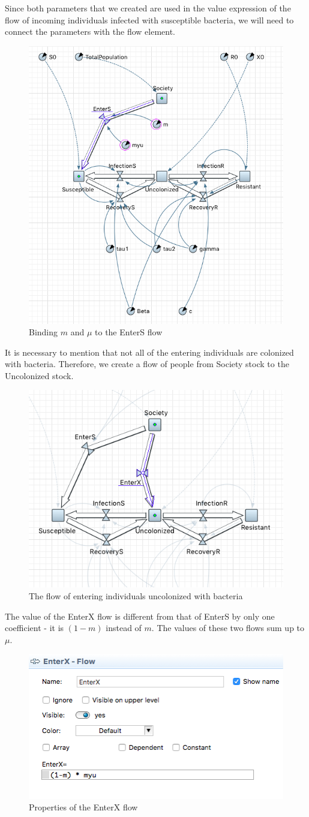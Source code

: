 Since both parameters that we created are used in the value expression of the flow of incoming individuals infected with susceptible bacteria, we will need to connect the parameters with the flow element.

\begin{figure}[H]
  \centering
  \includegraphics[height=0.6\textwidth]{img/screens/society/society8}
  \caption{Binding $m$ and $\mu$ to the EnterS flow}
\end{figure}

It is necessary to mention that not all of the entering individuals are colonized with bacteria. Therefore, we create a flow of people from Society stock to the Uncolonized stock.

\begin{figure}[H]
  \centering
  \includegraphics[height=0.4\textwidth]{img/screens/society/society9 }
  \caption{The flow of entering individuals uncolonized with bacteria}
\end{figure}

The value of the EnterX flow is different from that of EnterS by only one coefficient - it is $(1 - m)$ instead of $m$. The values of these two flows sum up to $\mu$.

\begin{figure}[H]
  \centering
  \includegraphics[height=0.3\textwidth]{img/screens/society/society17 }
  \caption{Properties of the EnterX flow}
\end{figure}

